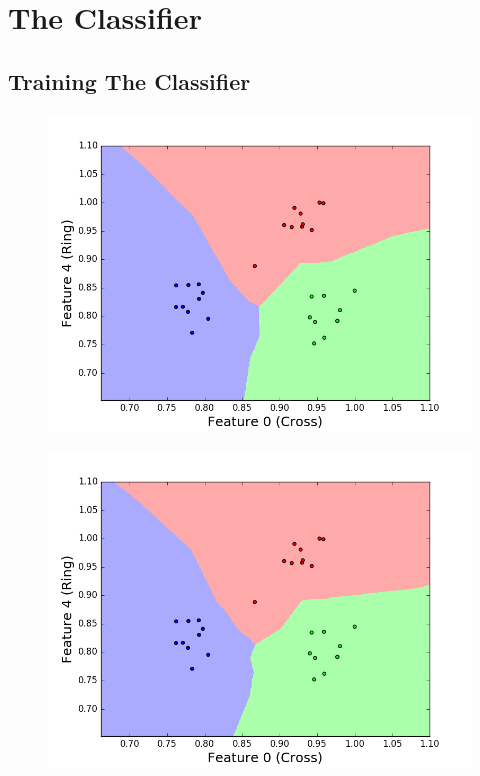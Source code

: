 \documentclass[11pt, a4paper]{article}
\begin{document}

\section{The Classifier}
\subsection{Training The Classifier}

\begin{figure}[!h]
\begin{minipage}[b]{.5\textwidth}
\centering
\includegraphics[width=1\textwidth]{training_plot_k1.png}
\label{fig:traina}
\end{minipage}%
\begin{minipage}[b]{.5\textwidth}
\centering
\includegraphics[width=1\textwidth]{training_plot_k2.png}

\end{minipage}
\end{figure}
\end{document}
